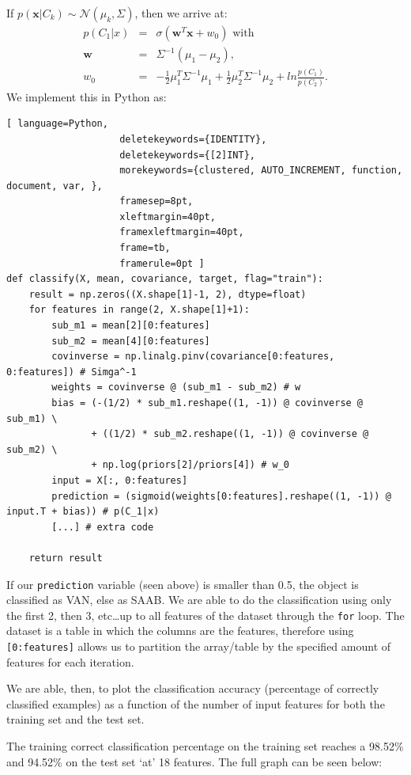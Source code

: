 \documentclass[a4paper,11pt,oneside]{article}
\begin{document}
If $p(\textbf{x}|C_k) \sim \mathcal{N}(\mu_k, \Sigma)$, then we arrive at:
\begin{eqnarray*}
p(C_1|x)	&	=	&	\sigma(\textbf{w}^T\textbf{x} + w_0) \textrm{ with}\\
\textbf{w}	&	=	&	\Sigma^{-1}(\mu_1 - \mu_2)\textrm{,}\\
w_0	&	=	&	-\frac{1}{2}\mu_1^T\Sigma^{-1}\mu_1 + \frac{1}{2}\mu_2^T\Sigma^{-1}\mu_2 + ln\frac{p(C_1)}{p(C_2)}\textrm{.}
\end{eqnarray*}
We implement this in Python as:
\begin{lstlisting}[ language=Python,
                    deletekeywords={IDENTITY},
                    deletekeywords={[2]INT},
                    morekeywords={clustered, AUTO_INCREMENT, function, document, var, },
                    framesep=8pt,
                    xleftmargin=40pt,
                    framexleftmargin=40pt,
                    frame=tb,
                    framerule=0pt ]
def classify(X, mean, covariance, target, flag="train"):
    result = np.zeros((X.shape[1]-1, 2), dtype=float)
    for features in range(2, X.shape[1]+1):
        sub_m1 = mean[2][0:features]
        sub_m2 = mean[4][0:features]
        covinverse = np.linalg.pinv(covariance[0:features, 0:features]) # Simga^-1
        weights = covinverse @ (sub_m1 - sub_m2) # w
        bias = (-(1/2) * sub_m1.reshape((1, -1)) @ covinverse @ sub_m1) \
               + ((1/2) * sub_m2.reshape((1, -1)) @ covinverse @ sub_m2) \
               + np.log(priors[2]/priors[4]) # w_0
        input = X[:, 0:features]
        prediction = (sigmoid(weights[0:features].reshape((1, -1)) @ input.T + bias)) # p(C_1|x)
        [...] # extra code

    return result
\end{lstlisting}

If our \texttt{prediction} variable (seen above) is smaller than 0.5, the object is classified as VAN, else as SAAB. We are able to do the classification using only the first 2, then 3, etc\dots up to all features of the dataset through the \texttt{for} loop. The dataset is a table in which the columns are the features, therefore using \texttt{[0:features]} allows us to partition the array/table by the specified amount of features for each iteration. 

We are able, then, to plot the classification accuracy (percentage of correctly classified examples) as a function of the number of input features for both the training set and the test set. 

The training correct classification percentage on the training set reaches a 98.52\% and 94.52\% on the test set `at' 18 features. The full graph can be seen below:
\end{document}
